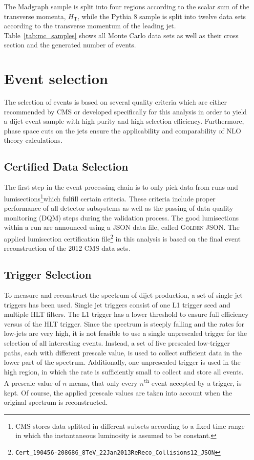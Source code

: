 The Madgraph sample is split into four regions according to the scalar sum of
the transverse momenta, $H_{\mathrm{T}}$, while the Pythia 8 sample is split
into twelve data sets according to the transverse momentum of the leading jet.
Table~\ref{tab:mc_samples} shows all Monte Carlo data sets as well as their cross
section and the generated number of events.

\section{Event selection}
\label{sec:event_selection}

The selection of events is based on several quality criteria which are either
recommended by CMS or developed specifically for this analysis in order to yield
a dijet event sample with high purity and high selection efficiency.
Furthermore, phase space cuts on the jets ensure the applicability and
comparability of NLO theory calculations.

\subsection{Certified Data Selection}

The first step in the event processing chain is to only pick data from runs and
lumisections\footnote{CMS stores data splitted in different subsets according to
    a fixed time range in which the instantaneous luminosity is assumed to be
constant.}which fulfill certain criteria. These criteria include
proper performance of all detector subsystems as well as the passing of data
quality monitoring (DQM) steps during the validation process. The good
lumisections within a run are announced using a JSON data file, called
\textsc{Golden JSON}. The applied lumisection certification
file\footnote{\texttt{Cert\_190456-208686\_8TeV\_22Jan2013ReReco\_Collisions12\_JSON}}
in this analysis is based on the final event reconstruction of the 2012 CMS data
sets.

\subsection{Trigger Selection}

To measure and reconstruct the \ptavg spectrum of dijet production, a set of
single jet triggers has been used. Single jet triggers consist of one L1 trigger
seed and multiple HLT filters. The L1 trigger has a lower threshold to ensure
full efficiency versus \pt of the HLT trigger. Since the \pt spectrum is steeply
falling and the rates for low-\pt jets are very high, it is not feasible to use
a single unprescaled trigger for the selection of all interesting events.
Instead, a set of five prescaled low-\pt trigger paths, each with different
prescale value, is used to collect sufficient data in the lower part of the \pt
spectrum.  Additionally, one unprescaled trigger is used in the high \pt region, in
which the rate is sufficiently small to collect and store all
events. A prescale value of $n$ means, that only every $n$\textsuperscript{th} event accepted by
a trigger, is kept. Of course, the applied prescale values are taken into
account when the original spectrum is reconstructed. 

